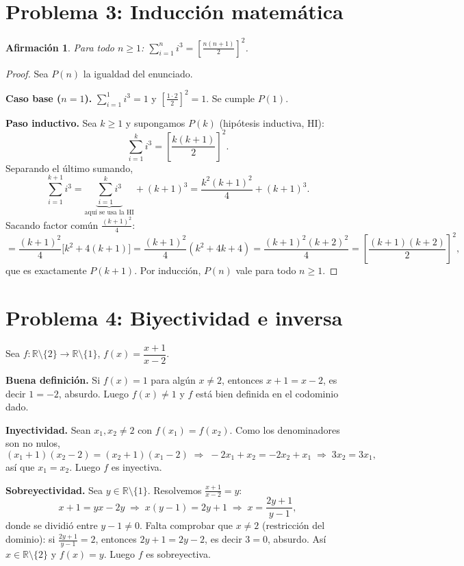 \documentclass[11pt]{article}
\newtheorem*{afirmacion}{Afirmación}
\newcommand{\R}{\mathbb{R}}
\begin{document}
\section*{Problema 3: Inducción matemática}

\begin{afirmacion}
Para todo $n\ge 1$: $\displaystyle\sum_{i=1}^{n} i^3=\left[\frac{n(n+1)}{2}\right]^2$.
\end{afirmacion}

\begin{proof}
Sea $P(n)$ la igualdad del enunciado.

\textbf{Caso base ($n=1$).} $\sum_{i=1}^{1} i^3=1$ y $\left[\frac{1\cdot 2}{2}\right]^2=1$. Se cumple $P(1)$.

\textbf{Paso inductivo.} Sea $k\ge 1$ y supongamos $P(k)$ (hipótesis inductiva, HI):
\[
\sum_{i=1}^{k} i^3=\left[\frac{k(k+1)}{2}\right]^2 .
\]
Separando el último sumando,
\[
\sum_{i=1}^{k+1} i^3=\underbrace{\sum_{i=1}^{k} i^3}_{\text{aquí se usa la HI}}+(k+1)^3
=\frac{k^2(k+1)^2}{4}+(k+1)^3 .
\]
Sacando factor común $\frac{(k+1)^2}{4}$:
\[
=\frac{(k+1)^2}{4}\bigl[k^2+4(k+1)\bigr]
=\frac{(k+1)^2}{4}(k^2+4k+4)
=\frac{(k+1)^2(k+2)^2}{4}
=\left[\frac{(k+1)(k+2)}{2}\right]^2,
\]
que es exactamente $P(k+1)$. Por inducción, $P(n)$ vale para todo $n\ge 1$.
\end{proof}

\section*{Problema 4: Biyectividad e inversa}

Sea $f:\R\setminus\{2\}\to\R\setminus\{1\}$, $f(x)=\dfrac{x+1}{x-2}$.

\textbf{Buena definición.} Si $f(x)=1$ para algún $x\neq 2$, entonces $x+1=x-2$, es decir $1=-2$, absurdo. Luego $f(x)\neq 1$ y $f$ está bien definida en el codominio dado.

\textbf{Inyectividad.} Sean $x_1,x_2\neq 2$ con $f(x_1)=f(x_2)$. Como los denominadores son no nulos,
\[
(x_1+1)(x_2-2)=(x_2+1)(x_1-2)
\;\Longrightarrow\; -2x_1+x_2=-2x_2+x_1
\;\Longrightarrow\; 3x_2=3x_1,
\]
así que $x_1=x_2$. Luego $f$ es inyectiva.

\textbf{Sobreyectividad.} Sea $y\in\R\setminus\{1\}$. Resolvemos $\frac{x+1}{x-2}=y$:
\[
x+1=yx-2y \;\Longrightarrow\; x(y-1)=2y+1 \;\Longrightarrow\; x=\frac{2y+1}{y-1},
\]
donde se dividió entre $y-1\neq 0$. Falta comprobar que $x\neq 2$ (restricción del dominio): si
$\frac{2y+1}{y-1}=2$, entonces $2y+1=2y-2$, es decir $3=0$, absurdo. Así $x\in\R\setminus\{2\}$ y $f(x)=y$. Luego $f$ es sobreyectiva.
\end{document}
